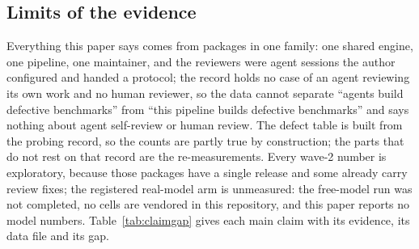 \subsection{Limits of the evidence}
Everything this paper says comes from \suitePackages{} packages in one family: one shared engine, one pipeline, one maintainer, and the reviewers were agent sessions the author configured and handed a protocol; the record holds no case of an agent reviewing its own work and no human reviewer, so the data cannot separate ``agents build defective benchmarks'' from ``this pipeline builds defective benchmarks'' and says nothing about agent self-review or human review. The defect table is built from the probing record, so the counts are partly true by construction; the parts that do not rest on that record are the re-measurements. Every wave-2 number is exploratory, because those packages have a single release and some already carry review fixes; the registered real-model arm is unmeasured: the free-model run was not completed, no cells are vendored in this repository, and this paper reports no model numbers. Table~\ref{tab:claimgap} gives each main claim with its evidence, its data file and its gap.

